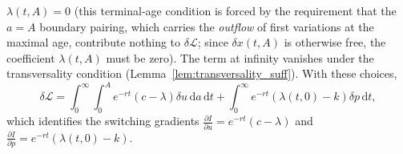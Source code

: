 \documentclass[pdflatex,sn-mathphys-num]{sn-jnl}
\theoremstyle{definition}
\theoremstyle{remark}
\newcommand{\dd}{\,\mathrm{d}}
\begin{document}
$\lambda(t,A)=0$ (this terminal-age condition is
forced by the requirement that the $a=A$ boundary pairing, which carries the
\emph{outflow} of first variations at the maximal age, contribute nothing to
$\delta\mathcal L$; since $\delta x(t,A)$ is otherwise free, the coefficient
$\lambda(t,A)$ must be zero).
The term at infinity vanishes under the
transversality condition (Lemma~\ref{lem:transversality_suff}). With these
choices,
\begin{equation}\label{eq:pf_deltaL_reduced}
\delta\mathcal L=\int_0^\infty\!\!\int_0^A e^{-rt}(c-\lambda)\delta u\dd a\dd t
+\int_0^\infty e^{-rt}(\lambda(t,0)-k)\delta p\dd t,
\end{equation}
which identifies the switching gradients
$\frac{\partial I}{\partial u}=e^{-rt}(c-\lambda)$ and
$\frac{\partial I}{\partial p}=e^{-rt}(\lambda(t,0)-k)$.
\end{document}

